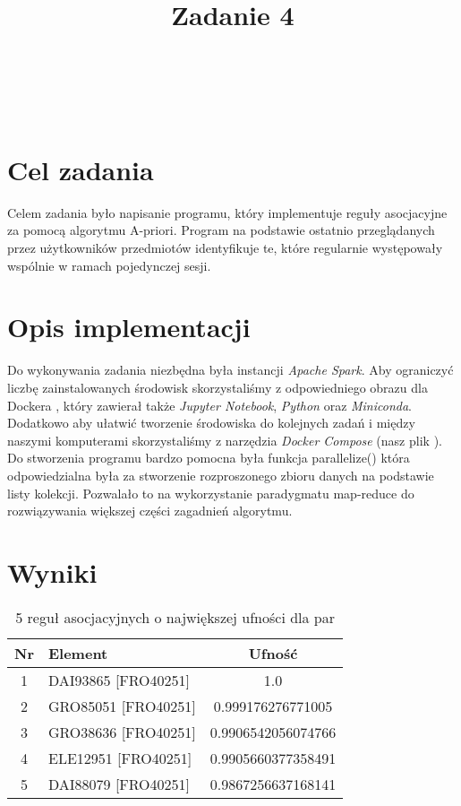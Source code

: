 \documentclass{classrep}
\author{%
\\
  \studentinfo[234128@edu.p.lodz.pl]{Piotr Wardęcki}{234128}\\
  \studentinfo[234053@edu.p.lodz.pl]{Paweł Galewicz}{234053}\\
  \studentinfo[234067@edu.p.lodz.pl]{Bartosz Jurczewski}{234067}%
}
\title{Zadanie 4}
\begin{document}
\maketitle
\thispagestyle{fancyplain}
\clearpage

\section{Cel zadania}
Celem zadania było napisanie programu, który implementuje reguły asocjacyjne za pomocą algorytmu A-priori. Program na podstawie ostatnio przeglądanych przez użytkowników przedmiotów identyfikuje te, które regularnie występowały wspólnie w ramach pojedynczej sesji.



\section{Opis implementacji}
Do wykonywania zadania niezbędna była instancji \textit{Apache Spark}. Aby ograniczyć liczbę zainstalowanych środowisk skorzystaliśmy z odpowiedniego obrazu dla Dockera \cite{docker}, który zawierał także \textit{Jupyter Notebook}, \textit{Python} oraz \textit{Miniconda}. Dodatkowo aby ułatwić tworzenie środowiska do kolejnych zadań i między naszymi komputerami skorzystaliśmy z narzędzia \textit{Docker Compose} (nasz plik \cite{docker-compose}). Do stworzenia programu bardzo pomocna była funkcja parallelize() która odpowiedzialna była za stworzenie rozproszonego zbioru danych na podstawie listy kolekcji. Pozwalało to na wykorzystanie paradygmatu map-reduce do rozwiązywania większej części zagadnień algorytmu.

\section{Wyniki}
\begin{table}[H]
\centering
\caption{5 reguł asocjacyjnych o największej ufności dla par}
\begin{tabular}{|c|l|c|}
\hline
\rowcolor[HTML]{FFCE93} 
{\color[HTML]{000000} \textbf{Nr}} & \textbf{Element}        & \textbf{Ufność}    \\ \hline
1                                  & DAI93865 { [}FRO40251{]} & 1.0                \\ \hline
2                                  & GRO85051 {[}FRO40251{]} & 0.999176276771005  \\ \hline
3                                  & GRO38636 {[}FRO40251{]} & 0.9906542056074766 \\ \hline
4                                  & ELE12951 { [}FRO40251{]} & 0.9905660377358491 \\ \hline
5                                  & DAI88079 { [}FRO40251{]} & 0.9867256637168141 \\ \hline
\end{tabular}
\end{table}
\end{document}
